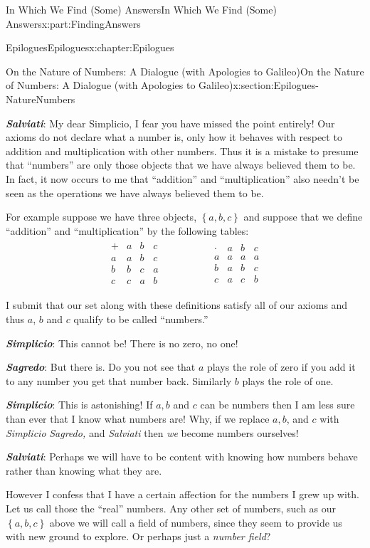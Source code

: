 \documentclass[oneside,10pt,]{book}
\newcommand{\alert}[1]{\textbf{\textit{#1}}}
\numberwithin{equation}{section}
\newcommand{\amp}{&}
\begin{document}
\begin{partptx}{In Which We Find (Some) Answers}{}{In Which We Find (Some) Answers}{}{}{x:part:FindingAnswers}
\begin{chapterptx}{Epilogues}{}{Epilogues}{}{}{x:chapter:Epilogues}
\begin{sectionptx}{On the Nature of Numbers: A Dialogue (with Apologies to Galileo)}{}{On the Nature of Numbers: A Dialogue (with Apologies to Galileo)}{}{}{x:section:Epilogues-NatureNumbers}
\begin{introduction}{}
\par
\alert{Salviati}:  My dear Simplicio, I fear you have missed the point entirely! Our axioms do not declare what a number is, only how it behaves with respect to addition and multiplication with other numbers. Thus it is a mistake to presume that ``numbers'' are only those objects that we have always believed them to be. In fact, it now occurs to me that ``addition'' and ``multiplication'' also needn't be seen as the operations we have always believed them to be.%
\par
For example suppose we have three objects, \(\left\{a, b, c\right\}\) and suppose that we define ``addition'' and ``multiplication'' by the following tables:%
\begin{align*}
\begin{array}{c|ccc} 
+\amp a\amp b\amp c\\\hline 
a\amp a\amp b\amp c\\
b\amp b\amp c\amp a\\ 
c\amp c\amp a\amp b 
\end{array}  
\amp \amp \amp \amp \amp \amp 
\begin{array}{c|ccc} 
\cdot\amp a\amp b\amp c\\\hline 
a\amp a\amp a\amp a\\ 
b\amp a\amp b\amp c\\ 
c\amp a\amp c\amp b 
\end{array} 
\end{align*}
%
\par
I submit that our set along with these definitions satisfy all of our axioms and thus \(a\), \(b\) and \(c\) qualify to be called ``numbers.''%
\par
\alert{Simplicio}:  This cannot be! There is no zero, no one!%
\par
\alert{Sagredo}:  But there is. Do you not see that \(a\) plays the role of zero \textemdash{} if you add it to any number you get that number back. Similarly \(b\) plays the role of one.%
\par
\alert{Simplicio}: This is astonishing! If \(a, b\) and \(c\) can be numbers then I am less sure than ever that I know what numbers are! Why, if we replace \(a, b\), and \(c\) with \emph{Simplicio} \emph{Sagredo,} and \emph{Salviati} then \emph{we} become numbers ourselves!%
\par
\alert{Salviati}:  Perhaps we will have to be content with knowing how numbers behave rather than knowing what they are.%
\par
However I confess that I have a certain affection for the numbers I grew up with. Let us call those the ``real'' numbers. Any other set of numbers, such as our \(\left\{a,b,c\right\}\) above we will call a field of numbers, since they seem to provide us with new ground to explore. Or perhaps just a \emph{number field}?%

\end{introduction}
\end{sectionptx}
\end{chapterptx}
\end{partptx}
\end{document}

